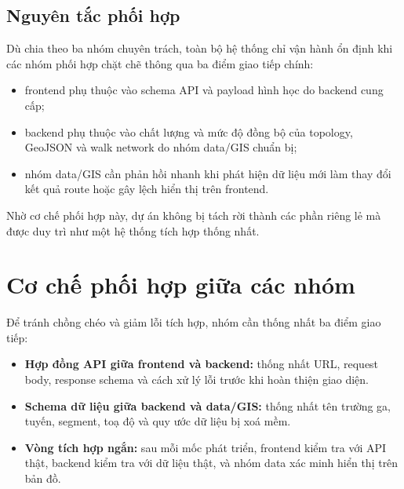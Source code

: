 \documentclass[../DoAn.tex]{subfiles}
\begin{document}
\subsection{Nguyên tắc phối hợp}
Dù chia theo ba nhóm chuyên trách, toàn bộ hệ thống chỉ vận hành ổn định khi các nhóm phối hợp chặt chẽ thông qua ba điểm giao tiếp chính:
\begin{itemize}
    \item frontend phụ thuộc vào schema API và payload hình học do backend cung cấp;
    \item backend phụ thuộc vào chất lượng và mức độ đồng bộ của topology, GeoJSON và walk network do nhóm data/GIS chuẩn bị;
    \item nhóm data/GIS cần phản hồi nhanh khi phát hiện dữ liệu mới làm thay đổi kết quả route hoặc gây lệch hiển thị trên frontend.
\end{itemize}

Nhờ cơ chế phối hợp này, dự án không bị tách rời thành các phần riêng lẻ mà được duy trì như một hệ thống tích hợp thống nhất.

\section{Cơ chế phối hợp giữa các nhóm}
Để tránh chồng chéo và giảm lỗi tích hợp, nhóm cần thống nhất ba điểm giao tiếp:
\begin{itemize}
    \item \textbf{Hợp đồng API giữa frontend và backend:} thống nhất URL, request body, response schema và cách xử lý lỗi trước khi hoàn thiện giao diện.
    \item \textbf{Schema dữ liệu giữa backend và data/GIS:} thống nhất tên trường ga, tuyến, segment, toạ độ và quy ước dữ liệu bị xoá mềm.
    \item \textbf{Vòng tích hợp ngắn:} sau mỗi mốc phát triển, frontend kiểm tra với API thật, backend kiểm tra với dữ liệu thật, và nhóm data xác minh hiển thị trên bản đồ.
\end{itemize}
\end{document}
